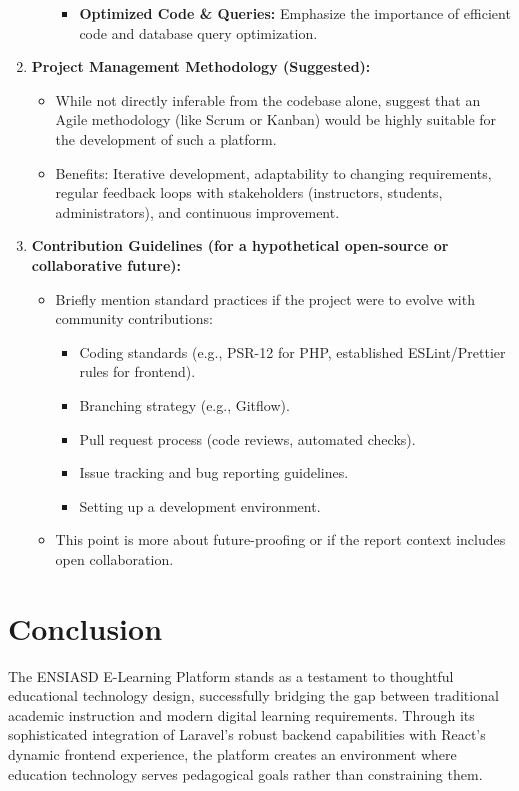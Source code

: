 \documentclass[12pt,a4paper]{article}
\begin{document}
\begin{enumerate}
\begin{itemize}
\begin{itemize}
            \item \textbf{Optimized Code \& Queries:} Emphasize the importance of efficient code and database query optimization.
        \end{itemize}
    \end{itemize}
    \item \textbf{Project Management Methodology (Suggested):}
    \begin{itemize}
        \item While not directly inferable from the codebase alone, suggest that an Agile methodology (like Scrum or Kanban) would be highly suitable for the development of such a platform.
        \item Benefits: Iterative development, adaptability to changing requirements, regular feedback loops with stakeholders (instructors, students, administrators), and continuous improvement.
    \end{itemize}
    \item \textbf{Contribution Guidelines (for a hypothetical open-source or collaborative future):}
    \begin{itemize}
        \item Briefly mention standard practices if the project were to evolve with community contributions:
        \begin{itemize}
            \item Coding standards (e.g., PSR-12 for PHP, established ESLint/Prettier rules for frontend).
            \item Branching strategy (e.g., Gitflow).
            \item Pull request process (code reviews, automated checks).
            \item Issue tracking and bug reporting guidelines.
            \item Setting up a development environment.
        \end{itemize}
        \item This point is more about future-proofing or if the report context includes open collaboration.
    \end{itemize}
\end{enumerate}

\section{Conclusion}

The ENSIASD E-Learning Platform stands as a testament to thoughtful educational technology design, successfully bridging the gap between traditional academic instruction and modern digital learning requirements. Through its sophisticated integration of Laravel's robust backend capabilities with React's dynamic frontend experience, the platform creates an environment where education technology serves pedagogical goals rather than constraining them.
\end{document}
